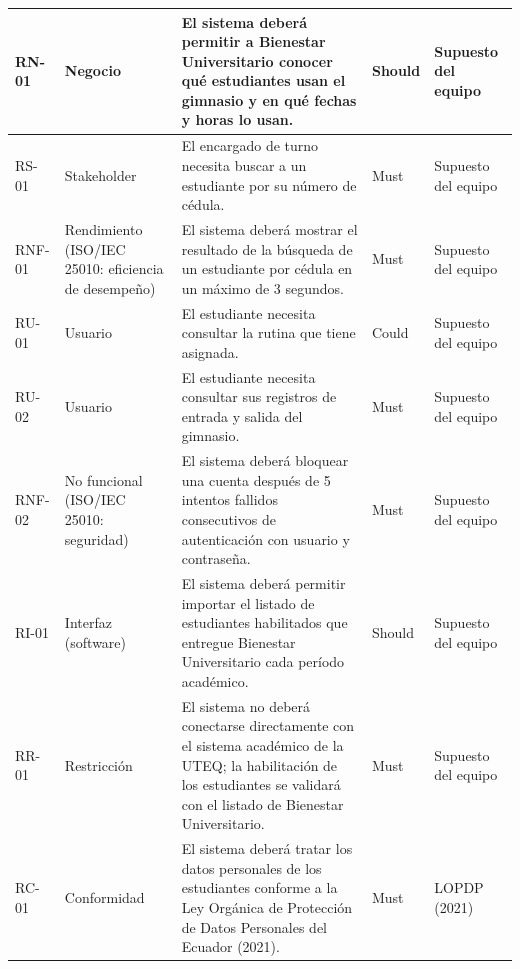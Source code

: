 {\begin{xltabular}{\textwidth}{|>{\raggedright\arraybackslash}p{1.3cm}|>{\raggedright\arraybackslash}p{2.4cm}|L|>{\centering\arraybackslash}p{1.6cm}|>{\raggedright\arraybackslash}p{2.4cm}|}
RN-01 & Negocio & El sistema deberá permitir a Bienestar Universitario conocer qué estudiantes usan el gimnasio y en qué fechas y horas lo usan. & Should & Supuesto del equipo \\ \hline
RS-01 & Stakeholder & El encargado de turno necesita buscar a un estudiante por su número de cédula. & Must & Supuesto del equipo \\ \hline
RNF-01 & Rendimiento (ISO/IEC 25010: eficiencia de desempeño) & El sistema deberá mostrar el resultado de la búsqueda de un estudiante por cédula en un máximo de 3 segundos. & Must & Supuesto del equipo \\ \hline
RU-01 & Usuario & El estudiante necesita consultar la rutina que tiene asignada. & Could & Supuesto del equipo \\ \hline
RU-02 & Usuario & El estudiante necesita consultar sus registros de entrada y salida del gimnasio. & Must & Supuesto del equipo \\ \hline
RNF-02 & No funcional (ISO/IEC 25010: seguridad) & El sistema deberá bloquear una cuenta después de 5 intentos fallidos consecutivos de autenticación con usuario y contraseña. & Must & Supuesto del equipo \\ \hline
RI-01 & Interfaz (software) & El sistema deberá permitir importar el listado de estudiantes habilitados que entregue Bienestar Universitario cada período académico. & Should & Supuesto del equipo \\ \hline
RR-01 & Restricción & El sistema no deberá conectarse directamente con el sistema académico de la UTEQ; la habilitación de los estudiantes se validará con el listado de Bienestar Universitario. & Must & Supuesto del equipo \\ \hline
RC-01 & Conformidad & El sistema deberá tratar los datos personales de los estudiantes conforme a la Ley Orgánica de Protección de Datos Personales del Ecuador (2021). & Must & LOPDP (2021)~\cite{lopdp2021} \\ \hline
\end{xltabular}
}
